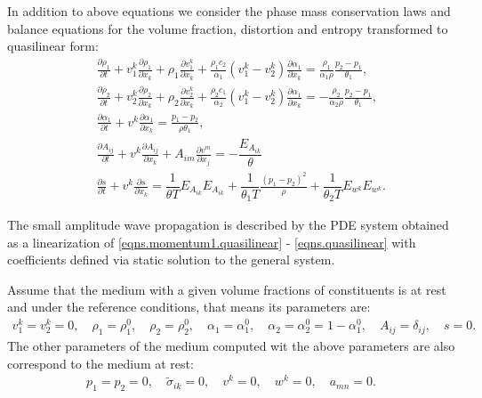 \documentclass[3p,times]{elsarticle}
\begin{document}
In addition to above equations we consider the phase mass conservation laws and balance equations for the volume fraction, distortion and entropy transformed to quasilinear form:
\begin{eqnarray} \label{eqns.quasilinear}
&&\frac{\partial \rho_1}{\partial t}+v^k_1\frac{\partial \rho_1}{\partial x_k}+\rho_1 \frac{\partial v^k_1}{\partial x_k}+
\frac{\rho_1c_2}{\alpha_1}(v^k_1-v^k_2)\frac{\partial \alpha_1}{\partial x_k}=
\frac{\rho_1}{\alpha_1 \rho} \frac{p_2-p_1}{\theta_1},  \nonumber \\
&&\frac{\partial \rho_2}{\partial t}+v^k_2\frac{\partial \rho_2}{\partial x_k}+\rho_2 \frac{\partial v^k_2}{\partial x_k}+
\frac{\rho_2c_1}{\alpha_2}(v^k_1-v^k_2)\frac{\partial \alpha_1}{\partial x_k}=
-\frac{\rho_2}{\alpha_2 \rho} \frac{p_2-p_1}{\theta_1},  \nonumber \\
&&\frac{\partial \alpha_1}{\partial t}+v^k\frac{\partial \alpha_1}{\partial x_k}=
\frac{p_1-p_2}{\rho \theta_1},  \\
&&\frac{\partial A_{i j}}{\partial t}+v^k \frac{\partial A_{ij}}{\partial x_k}
+A_{im}\frac{\partial v^m}{\partial x_j}
=-\dfrac{ E_{A_{ik}} }{\theta} \nonumber \\
&&\frac{\partial s}{\partial t}+v^k\frac{\partial s}{\partial x_k}=
\dfrac{1}{\theta T} E_{A_{ik}}E_{A_{ik}} +
\dfrac{1}{\theta_1 T}\frac{(p_1-p_2)^2}{\rho} +
\dfrac{1}{\theta_2 T} E_{w^k}E_{w^k}. \nonumber 
\end{eqnarray}

The small amplitude wave propagation is described by the PDE system obtained as a linearization of \eqref{eqns.momentum1.quasilinear} - \eqref{eqns.quasilinear} with coefficients defined via static solution to the general system.

Assume that the medium with a given volume fractions of constituents is at rest and under the reference conditions, that means its parameters are:
\begin{align}  \label{static.solution}
v_1^k=v_2^k=0, \quad \rho_1=\rho_1^0, \quad \rho_2=\rho_2^0, 
\quad \alpha_1=\alpha_1^0, \quad \alpha_2=\alpha_2^0 = 1-\alpha_1^0, \quad A_{ij}=\delta_{ij}, \quad s=0.  
\end{align}  
The other parameters of the medium computed wit the above parameters are also correspond to the medium at rest:
\begin{align}
p_1=p_2=0, \quad \tilde \sigma_{ik}=0, \quad v^k=0, \quad w^k=0, \quad a_{mn}=0.
\end{align}
\end{document}
